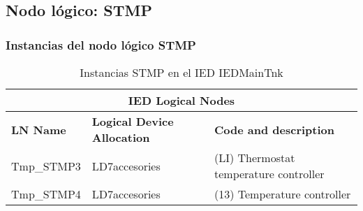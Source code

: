 
\subsection{Nodo l\'ogico: 			 STMP}

    \subsubsection{Instancias del nodo l\'ogico STMP}
    \begin{table}[H]
    \begin{center}
    \begin{tabular}{|l|l|p{6.8cm}|}
            \hline
            \multicolumn{3}{|c|}{\cellcolor[gray]{0.8} \textbf{IED Logical Nodes} } \\
            \hline
            \textbf{LN Name} & \textbf{Logical Device Allocation} & \textbf{Code and description} \\
            \hline
            Tmp\_STMP3 & LD7accesories & (LI) Thermostat temperature controller \\
            \hline
            Tmp\_STMP4 & LD7accesories & (13) Temperature controller \\
            \hline
    \end{tabular}
    \caption{Instancias STMP en el IED IEDMainTnk}
    \label{table:lnInstSTMP_thermostat}
    \end{center}
    \end{table}
    
    
    
